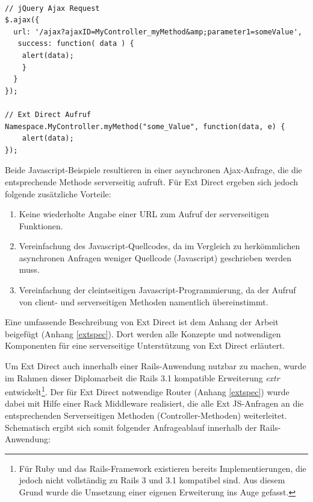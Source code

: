 \begin{lstlisting}[label=extinvoke, caption=Ajax-Anfrage an einen Server im jQuery-Framework]

// jQuery Ajax Request
$.ajax({
  url: '/ajax?ajaxID=MyController_myMethod&amp;parameter1=someValue',
   success: function( data ) {
    alert(data);
    }
  }
});

// Ext Direct Aufruf
Namespace.MyController.myMethod("some_Value", function(data, e) {
  	alert(data);
});

\end{lstlisting}

Beide Javascript-Beispiele resultieren in einer asynchronen Ajax-Anfrage, die die entsprechende Methode serverseitig aufruft. Für Ext Direct ergeben sich jedoch folgende zusätzliche Vorteile:

\begin{enumerate}
\item
Keine wiederholte Angabe einer URL zum Aufruf der serverseitigen Funktionen.
\item
Vereinfachung des Javascript-Quellcodes, da im Vergleich zu herkömmlichen asynchronen Anfragen weniger Quellcode (Javascript) geschrieben werden muss.
\item
Vereinfachung der cleintseitigen Javascript-Programmierung, da der Aufruf von client- und serverseitigen Methoden namentlich übereinstimmt.
\end{enumerate}

Eine umfassende Beschreibung von Ext Direct ist dem Anhang der Arbeit beigefügt (Anhang \ref{extspec}). Dort werden alle Konzepte und notwendigen Komponenten für eine serverseitige Unterstützung von Ext Direct erläutert.


Um Ext Direct auch innerhalb einer Rails-Anwendung nutzbar zu machen, wurde im Rahmen dieser Diplomarbeit die Rails 3.1 kompatible Erweiterung \emph{extr} entwickelt\footnote{Für Ruby und das Rails-Framework existieren bereits Implementierungen, die jedoch nicht vollständig zu Rails 3 und 3.1 kompatibel sind. Aus diesem Grund wurde die Umsetzung einer eigenen Erweiterung ins Auge gefasst.}.
Der für Ext Direct notwendige Router (Anhang \ref{extspec}) wurde dabei mit Hilfe einer Rack Middleware realisiert, die alle Ext JS-Anfragen an die entsprechenden Serverseitigen Methoden (Controller-Methoden) weiterleitet. Schematisch ergibt sich somit folgender Anfrageablauf innerhalb der Rails-Anwendung:

